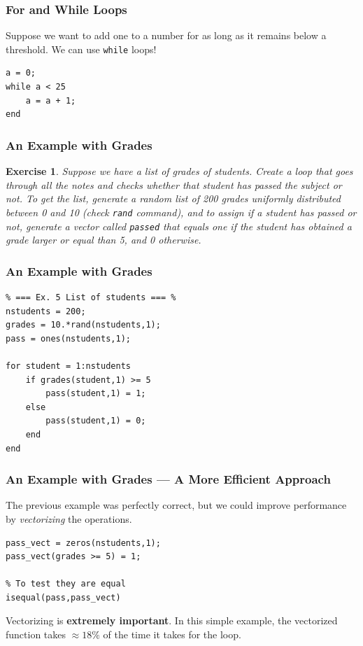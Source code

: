 \documentclass[11pt,xcolor={svgnames},aspectratio=169,usepdftitle=false]{beamer}
\newtheorem{exercise}{Exercise}
\begin{document}
\begin{frame}[fragile]
    \frametitle{For and While Loops}
Suppose we want to add one to a number for as long as it remains below a threshold. We can use \verb;while; loops!
\begin{lstlisting}
a = 0;
while a < 25
    a = a + 1;
end
\end{lstlisting}
\end{frame}

\begin{frame}[fragile]
    \frametitle{An Example with Grades}
\begin{exercise}
Suppose we have a list of grades of students. Create a loop that goes through all the notes and checks whether that student has passed the subject or not. To get the list, generate a random list of 200 grades uniformly distributed between 0 and 10 (check \verb;rand; command), and to assign if a student has passed or not, generate a vector called \verb;passed; that equals one if the student has obtained a grade larger or equal than 5, and 0 otherwise.
\end{exercise}
\end{frame}

\begin{frame}[fragile]
    \frametitle{An Example with Grades}
\begin{lstlisting}
% === Ex. 5 List of students === %
nstudents = 200;
grades = 10.*rand(nstudents,1);
pass = ones(nstudents,1);
    
for student = 1:nstudents
    if grades(student,1) >= 5
        pass(student,1) = 1;
    else
        pass(student,1) = 0;
    end
end
\end{lstlisting}
\end{frame}

\begin{frame}[fragile]
    \frametitle{An Example with Grades --- A More Efficient Approach}
The previous example was perfectly correct, but we could improve performance by \alert{\textit{vectorizing}} the operations.

\begin{lstlisting}
pass_vect = zeros(nstudents,1);
pass_vect(grades >= 5) = 1;

% To test they are equal
isequal(pass,pass_vect)
\end{lstlisting}    

Vectorizing is \alert{\textbf{extremely important}}. In this simple example, the vectorized function takes $\approx 18\%$ of the time it takes for the loop.

\end{frame}
\end{document}
